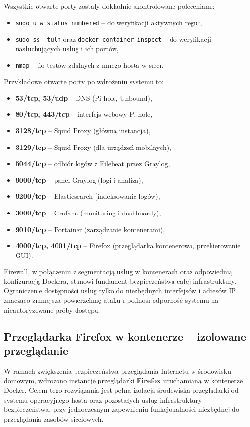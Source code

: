 \documentclass[
    left=2.5cm,         %
    right=2.5cm,        %
    top=2.5cm,          %
    bottom=3cm,         %
    bindingoffset=6mm,  %
    nohyphenation=true %
]{eiti/eiti-thesis} %
\begin{document}
Wszystkie otwarte porty zostały dokładnie skontrolowane poleceniami:
\begin{itemize}
    \item \texttt{sudo ufw status numbered} – do weryfikacji aktywnych reguł,
    \item \texttt{sudo ss -tuln} oraz \texttt{docker container inspect} – do weryfikacji nasłuchujących usług i ich portów,
    \item \texttt{nmap} – do testów zdalnych z innego hosta w sieci.
\end{itemize}

Przykładowe otwarte porty po wdrożeniu systemu to:
\begin{itemize}
    \item \textbf{53/tcp, 53/udp} – DNS (Pi-hole, Unbound),
    \item \textbf{80/tcp, 443/tcp} – interfejs webowy Pi-hole,
    \item \textbf{3128/tcp} – Squid Proxy (główna instancja),
    \item \textbf{3129/tcp} – Squid Proxy (dla urządzeń mobilnych),
    \item \textbf{5044/tcp} – odbiór logów z Filebeat przez Graylog,
    \item \textbf{9000/tcp} – panel Graylog (logi i analiza),
    \item \textbf{9200/tcp} – Elasticsearch (indeksowanie logów),
    \item \textbf{3000/tcp} – Grafana (monitoring i dashboardy),
    \item \textbf{9010/tcp} – Portainer (zarządzanie kontenerami),
    \item \textbf{4000/tcp, 4001/tcp} – Firefox (przeglądarka kontenerowa, przekierowanie GUI).
\end{itemize}

Firewall, w połączeniu z segmentacją usług w kontenerach oraz odpowiednią konfiguracją Dockera, stanowi fundament bezpieczeństwa całej infrastruktury. Ograniczenie dostępności usług tylko do niezbędnych interfejsów i adresów IP znacząco zmniejsza powierzchnię ataku i podnosi odporność systemu na nieautoryzowane próby dostępu.


\subsection{Przeglądarka Firefox w kontenerze – izolowane przeglądanie}

W ramach zwiększenia bezpieczeństwa przeglądania Internetu w środowisku domowym, wdrożono instancję przeglądarki \textbf{Firefox} uruchamianą w kontenerze Docker. Celem tego rozwiązania jest pełna izolacja środowiska przeglądarki od systemu operacyjnego hosta oraz pozostałych usług infrastruktury bezpieczeństwa, 
przy jednoczesnym zapewnieniu funkcjonalności niezbędnej do przeglądania zasobów sieciowych.
\end{document}
